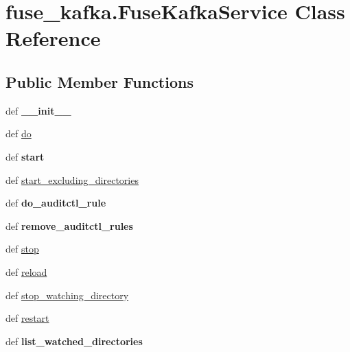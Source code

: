 \hypertarget{classfuse__kafka_1_1FuseKafkaService}{\section{fuse\-\_\-kafka.\-Fuse\-Kafka\-Service \-Class \-Reference}
\label{classfuse__kafka_1_1FuseKafkaService}
}
\subsection*{\-Public \-Member \-Functions}
\begin{DoxyCompactItemize}
\item 
\hypertarget{classfuse__kafka_1_1FuseKafkaService_a0bd77704cc258a800441426e62452195}{def {\bfseries \-\_\-\-\_\-init\-\_\-\-\_\-}}\label{classfuse__kafka_1_1FuseKafkaService_a0bd77704cc258a800441426e62452195}

\item 
def \hyperlink{classfuse__kafka_1_1FuseKafkaService_a08ccfab12ff2c998f5bc466de9c9afa4}{do}
\item 
\hypertarget{classfuse__kafka_1_1FuseKafkaService_a2d8e0d317d293fa8f932e3e8882549f5}{def {\bfseries start}}\label{classfuse__kafka_1_1FuseKafkaService_a2d8e0d317d293fa8f932e3e8882549f5}

\item 
def \hyperlink{classfuse__kafka_1_1FuseKafkaService_a8a8b5dd68c2c1dbd9315ac2ea4bd5219}{start\-\_\-excluding\-\_\-directories}
\item 
\hypertarget{classfuse__kafka_1_1FuseKafkaService_ade0772797e10e102f09fb39d94ae55ba}{def {\bfseries do\-\_\-auditctl\-\_\-rule}}\label{classfuse__kafka_1_1FuseKafkaService_ade0772797e10e102f09fb39d94ae55ba}

\item 
\hypertarget{classfuse__kafka_1_1FuseKafkaService_ac06b8bbc4db4a1179902e1ceab45eeef}{def {\bfseries remove\-\_\-auditctl\-\_\-rules}}\label{classfuse__kafka_1_1FuseKafkaService_ac06b8bbc4db4a1179902e1ceab45eeef}

\item 
def \hyperlink{classfuse__kafka_1_1FuseKafkaService_ad17bb7d3209b7242defee5aa54ca828e}{stop}
\item 
def \hyperlink{classfuse__kafka_1_1FuseKafkaService_a1f122fd8f929a5d8e56d8d1bad9cc465}{reload}
\item 
def \hyperlink{classfuse__kafka_1_1FuseKafkaService_a6ea1d1193be9c118752f6b7a4c53df92}{stop\-\_\-watching\-\_\-directory}
\item 
def \hyperlink{classfuse__kafka_1_1FuseKafkaService_a7cc4774d8ed31ffe42ca2f955501ee45}{restart}
\item 
\hypertarget{classfuse__kafka_1_1FuseKafkaService_aa7dd2095cfc8b080fba7047654e92eb9}{def {\bfseries list\-\_\-watched\-\_\-directories}}\label{classfuse__kafka_1_1FuseKafkaService_aa7dd2095cfc8b080fba7047654e92eb9}


\end{DoxyCompactItemize}
